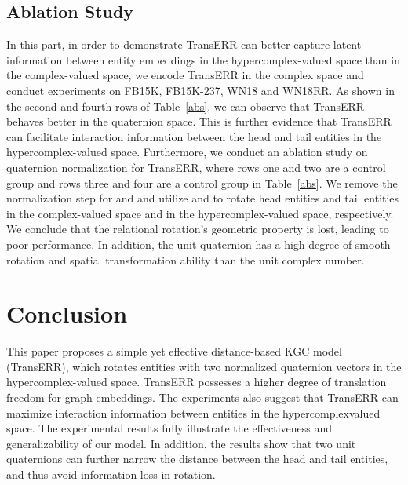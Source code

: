 \documentclass[11pt]{article}
\begin{document}
\subsection{Ablation Study}\label{sec6.5}
In this part, in order to demonstrate TransERR can better capture latent information between entity embeddings in the hypercomplex-valued space than in the complex-valued space, we encode TransERR in the complex space and conduct experiments on FB15K, FB15K-237, WN18 and WN18RR. As shown in the second and fourth rows of Table~\ref{abs},  we can observe that TransERR behaves better in the quaternion space. This is further evidence that TransERR can facilitate interaction information between the head and tail entities in the hypercomplex-valued space. Furthermore, we conduct an ablation study on quaternion normalization for TransERR, where rows one and two are a control group and rows three and four are a control group in Table~\ref{abs}. We remove the normalization step for  and  and utilize   and  to rotate head entities and tail entities in the complex-valued space and in the hypercomplex-valued space, respectively. We conclude that the relational rotation's geometric property is lost, leading to poor performance. In addition, the unit quaternion has a high degree of smooth rotation and spatial transformation ability than the unit complex number.




\section{Conclusion}
This paper proposes a simple yet effective distance-based KGC model (TransERR), which rotates entities with two normalized quaternion vectors in the hypercomplex-valued space. TransERR possesses a higher degree of translation freedom for graph embeddings. The experiments also suggest that TransERR can maximize interaction information between entities in the hypercomplexvalued space. The experimental results fully illustrate the effectiveness and generalizability of our model. In addition, the results show that two unit quaternions can further narrow the distance between the head and tail entities, and thus avoid information loss in rotation. 






\appendix
\end{document}
